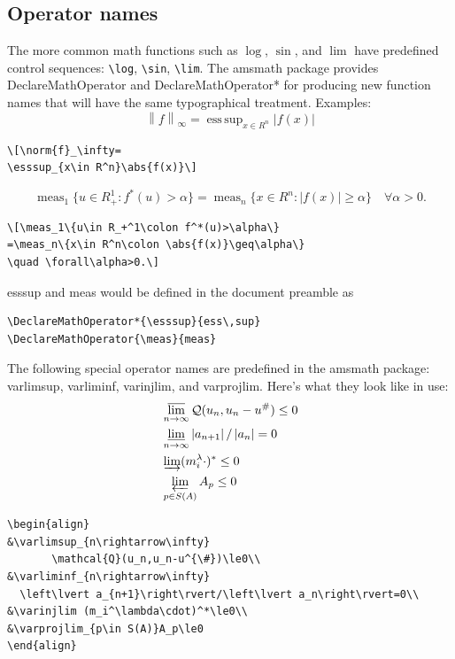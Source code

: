 \documentclass[manuscript, printscheme]{aomart}
\newcommand{\ntt}{\normalfont\ttfamily}
\newcommand{\cn}[1]{{\protect\ntt\bslash#1}}
\newcommand{\pkg}[1]{{\protect\ntt#1}}
\newtheorem[{}\it]{thm}{Theorem}[section]
\theoremstyle{definition}
\newtheorem*[{}\it]{notation}{Notation}
\DeclareMathOperator{\esssup}{ess\,sup}
\DeclareMathOperator{\meas}{meas}
\newcommand{\envert}[1]{\left\lvert#1\right\rvert}
\let\abs=\envert
\newcommand{\enVert}[1]{\left\lVert#1\right\rVert}
\let\norm=\enVert
\begin{document}
\subsection{Operator names}
The more common math functions such as $\log$, $\sin$, and $\lim$
have predefined control sequences: \verb=\log=, \verb=\sin=,
\verb=\lim=.
The \pkg{amsmath} package provides \cn{DeclareMathOperator} and
\cn{DeclareMathOperator*}
for producing new function names that will have the
same typographical treatment.
Examples:
\[\norm{f}_\infty=
\esssup_{x\in R^n}\abs{f(x)}\]
\begin{verbatim}
\[\norm{f}_\infty=
\esssup_{x\in R^n}\abs{f(x)}\]
\end{verbatim}
\[\meas_1\{u\in R_+^1\colon f^*(u)>\alpha\}
=\meas_n\{x\in R^n\colon \abs{f(x)}\geq\alpha\}
\quad \forall\alpha>0.\]
\begin{verbatim}
\[\meas_1\{u\in R_+^1\colon f^*(u)>\alpha\}
=\meas_n\{x\in R^n\colon \abs{f(x)}\geq\alpha\}
\quad \forall\alpha>0.\]
\end{verbatim}
\cn{esssup} and \cn{meas} would be defined in the document preamble as
\begin{verbatim}
\DeclareMathOperator*{\esssup}{ess\,sup}
\DeclareMathOperator{\meas}{meas}
\end{verbatim}

The following special operator names are predefined in the \pkg{amsmath}
package: \cn{varlimsup}, \cn{varliminf}, \cn{varinjlim}, and
\cn{varprojlim}. Here's what they look like in use:
\begin{align}
&\varlimsup_{n\rightarrow\infty}
       \mathcal{Q}(u_n,u_n-u^{\#})\le0\\
&\varliminf_{n\rightarrow\infty}
  \left\lvert a_{n+1}\right\rvert/\left\lvert a_n\right\rvert=0\\
&\varinjlim (m_i^\lambda\cdot)^*\le0\\
&\varprojlim_{p\in S(A)}A_p\le0
\end{align}
\begin{verbatim}
\begin{align}
&\varlimsup_{n\rightarrow\infty}
       \mathcal{Q}(u_n,u_n-u^{\#})\le0\\
&\varliminf_{n\rightarrow\infty}
  \left\lvert a_{n+1}\right\rvert/\left\lvert a_n\right\rvert=0\\
&\varinjlim (m_i^\lambda\cdot)^*\le0\\
&\varprojlim_{p\in S(A)}A_p\le0
\end{align}
\end{verbatim}
\end{document}
